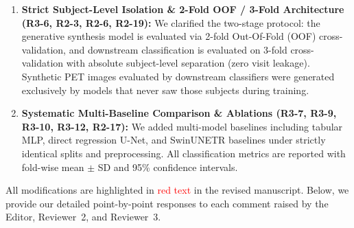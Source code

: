 \begin{enumerate}[leftmargin=1.5em, itemsep=4pt]
  \item \textbf{Strict Subject-Level Isolation \& 2-Fold OOF / 3-Fold Architecture (R3-6, R2-3, R2-6, R2-19):}
  We clarified the two-stage protocol: the generative synthesis model is evaluated via 2-fold Out-Of-Fold (OOF) cross-validation, and downstream classification is evaluated on 3-fold cross-validation with absolute subject-level separation (zero visit leakage). Synthetic PET images evaluated by downstream classifiers were generated exclusively by models that never saw those subjects during training.

  \item \textbf{Systematic Multi-Baseline Comparison \& Ablations (R3-7, R3-9, R3-10, R3-12, R2-17):}
  We added multi-model baselines including tabular MLP, direct regression U-Net, and SwinUNETR baselines under strictly identical splits and preprocessing. All classification metrics are reported with fold-wise mean $\pm$ SD and 95\% confidence intervals.
\end{enumerate}

All modifications are highlighted in \textcolor{red}{red text} in the revised manuscript. Below, we provide our detailed point-by-point responses to each comment raised by the Editor, Reviewer~2, and Reviewer~3.
